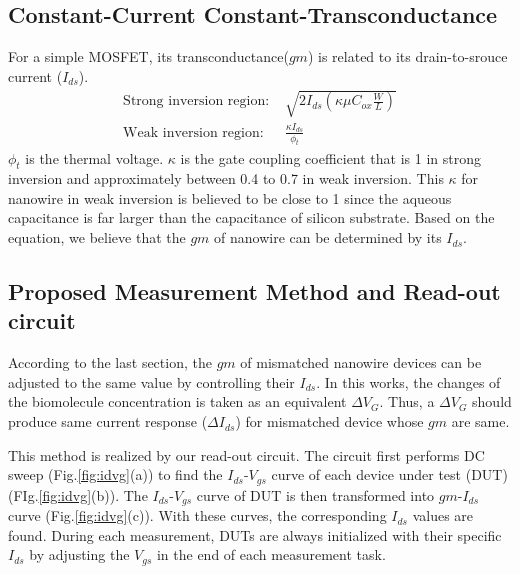 \documentclass{article}
\begin{document}
\subsection{Constant-Current Constant-Transconductance}
For a simple MOSFET, its transconductance($gm$) is related to its drain-to-srouce current ($I_{ds}$).
\begin{align}
    \text{Strong inversion region: } & \sqrt{2I_{ds} (\kappa \mu C_{ox} \frac{W}{L})} \\
    \text{Weak inversion region: }&  \frac{\kappa I_{ds}}{\phi_t}
\end{align}
$\phi_t$ is the thermal voltage.
$\kappa$ is the gate coupling coefficient that is 1 in strong inversion and approximately between 0.4 to 0.7 in weak inversion.
This $\kappa$ for nanowire in weak inversion is believed to be close to 1 since the aqueous capacitance is far larger than the capacitance of silicon substrate.
Based on the equation, we believe that the $gm$ of nanowire can be determined by its $I_{ds}$.

\subsection{Proposed Measurement Method and Read-out circuit}
According to the last section, the $gm$ of mismatched nanowire devices can be adjusted to the same value by controlling their $I_{ds}$.
In this works, the changes of the biomolecule concentration is taken as an equivalent $\Delta V_G$.
Thus, a $\Delta V_G$ should produce same current response ($\Delta I_{ds}$) for mismatched device whose $gm$ are same.

This method is realized by our read-out circuit.
The circuit first performs DC sweep (Fig.\ref{fig:idvg}(a)) to find the $I_{ds}$-$V_{gs}$ curve of each device under test (DUT) (FIg.\ref{fig:idvg}(b)).
The $I_{ds}$-$V_{gs}$ curve of DUT is then transformed into $gm$-$I_{ds}$ curve (Fig.\ref{fig:idvg}(c)).
With these curves, the corresponding $I_{ds}$ values are found.
During each measurement, DUTs are always initialized with their specific $I_{ds}$ by adjusting the $V_{gs}$ in the end of each measurement task.
\end{document}
